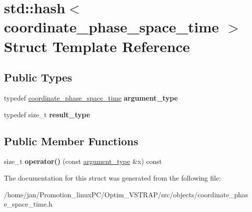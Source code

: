 \hypertarget{structstd_1_1hash_3_01coordinate__phase__space__time_01_4}{}\section{std\+:\+:hash$<$ coordinate\+\_\+phase\+\_\+space\+\_\+time $>$ Struct Template Reference}
\label{structstd_1_1hash_3_01coordinate__phase__space__time_01_4}
\subsection*{Public Types}
\begin{DoxyCompactItemize}
\item 
\mbox{\label{structstd_1_1hash_3_01coordinate__phase__space__time_01_4_a1ece1aa71d27828da1dfe89ef9148c89}} 
typedef \hyperlink{classcoordinate__phase__space__time}{coordinate\+\_\+phase\+\_\+space\+\_\+time} {\bfseries argument\+\_\+type}
\item 
\mbox{\label{structstd_1_1hash_3_01coordinate__phase__space__time_01_4_aee0af0c5edc703ce2958d3e03e9692b7}} 
typedef size\+\_\+t {\bfseries result\+\_\+type}
\end{DoxyCompactItemize}
\subsection*{Public Member Functions}
\begin{DoxyCompactItemize}
\item 
\mbox{\label{structstd_1_1hash_3_01coordinate__phase__space__time_01_4_a09402ca0b8c7669cced9eeca29d291e8}} 
size\+\_\+t {\bfseries operator()} (const \hyperlink{classcoordinate__phase__space__time}{argument\+\_\+type} \&x) const
\end{DoxyCompactItemize}


The documentation for this struct was generated from the following file\+:\begin{DoxyCompactItemize}
\item 
/home/jan/\+Promotion\+\_\+linux\+P\+C/\+Optim\+\_\+\+V\+S\+T\+R\+A\+P/src/objects/coordinate\+\_\+phase\+\_\+space\+\_\+time.\+h\end{DoxyCompactItemize}
